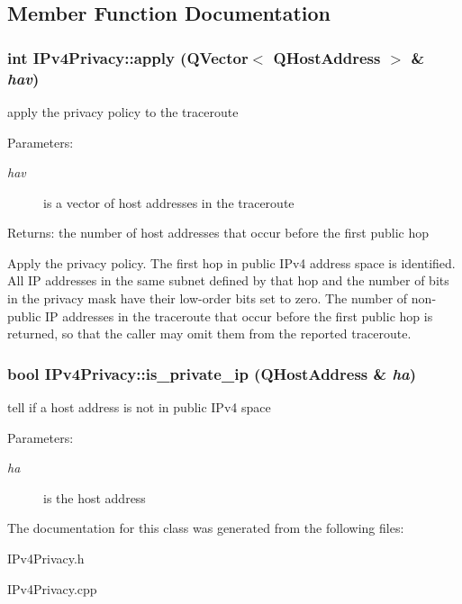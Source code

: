 \subsection{Member Function Documentation}
\hypertarget{classIPv4Privacy_253fc1c2a4ab5cf12814cbb04a18f6ec}{
\subsubsection[apply]{\setlength{\rightskip}{0pt plus 5cm}int IPv4Privacy::apply (QVector$<$ QHostAddress $>$ \& {\em hav})}}
\label{classIPv4Privacy_253fc1c2a4ab5cf12814cbb04a18f6ec}


apply the privacy policy to the traceroute \begin{Desc}
\item[Parameters:]
\begin{description}
\item[{\em hav}]is a vector of host addresses in the traceroute \end{description}
\end{Desc}
\begin{Desc}
\item[Returns:]the number of host addresses that occur before the first public hop\end{Desc}
Apply the privacy policy. The first hop in public IPv4 address space is identified. All IP addresses in the same subnet defined by that hop and the number of bits in the privacy mask have their low-order bits set to zero. The number of non-public IP addresses in the traceroute that occur before the first public hop is returned, so that the caller may omit them from the reported traceroute. \hypertarget{classIPv4Privacy_cb5f59d88c60a6dc64a3c73ae9f4bcd2}{
\subsubsection[is\_\-private\_\-ip]{\setlength{\rightskip}{0pt plus 5cm}bool IPv4Privacy::is\_\-private\_\-ip (QHostAddress \& {\em ha})}}
\label{classIPv4Privacy_cb5f59d88c60a6dc64a3c73ae9f4bcd2}


tell if a host address is not in public IPv4 space \begin{Desc}
\item[Parameters:]
\begin{description}
\item[{\em ha}]is the host address \end{description}
\end{Desc}


The documentation for this class was generated from the following files:\begin{CompactItemize}
\item 
IPv4Privacy.h\item 
IPv4Privacy.cpp\end{CompactItemize}
